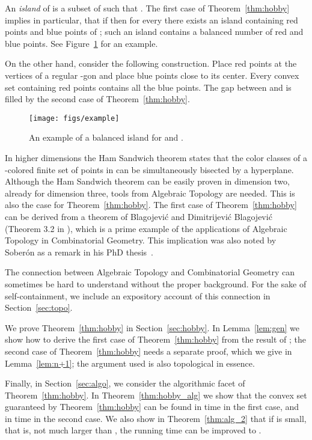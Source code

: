 \documentclass{article}
\begin{document}
An \emph{island} of  is a subset  of  such that .
The first case of Theorem~\ref{thm:hobby} implies in particular, that if  then
for every  there exists an island containing 
 red points and  blue points of ; such an island contains a balanced
number of red and blue points.  See Figure~\ref{fig:example} for an example.

On the other hand, consider the following construction.
Place  red points at the vertices of a regular -gon and place
 blue points close to its center. Every convex set containing 
 red points contains all the blue points.
The gap between  and 
is filled by the second case of Theorem~\ref{thm:hobby}.

\begin{figure}
  \begin{center}
   \texttt{[image: figs/example]}
\end{center}
\caption{An example of a balanced island for  and .}
\label{fig:example}
\end{figure}

In higher dimensions the Ham Sandwich theorem states that the color 
classes of a -colored finite set of points  in  can be 
simultaneously bisected by a hyperplane. Although the Ham Sandwich 
theorem can be easily proven in dimension two, already
for dimension three, tools from Algebraic Topology 
are needed. This is also the case for Theorem~\ref{thm:hobby}.
The first case of Theorem~\ref{thm:hobby} can be derived from
a theorem of Blagojevi\'c and Dimitrijevi\'c Blagojevi\'c (Theorem 3.2 in \cite{equivariant}), 
which is a prime example of the applications of Algebraic Topology in Combinatorial Geometry.
This implication was also noted by Sober\'on as a remark in his PhD thesis~\cite{pablo}. 

The connection between Algebraic Topology and Combinatorial Geometry
can sometimes be hard to understand without the proper background.
For the sake of self-containment, 
we include an expository account of this connection in Section~\ref{sec:topo}.

We prove Theorem~\ref{thm:hobby} in Section~\ref{sec:hobby}. In Lemma~\ref{lem:gen}
we show how to derive the first case of Theorem~\ref{thm:hobby} from the result
of \cite{equivariant};  the second case of Theorem~\ref{thm:hobby} needs a separate proof, 
which we give in Lemma~\ref{lem:n+1}; the argument used is also topological in essence. 


Finally,  in Section~\ref{sec:algo}, we consider the algorithmic facet of Theorem~\ref{thm:hobby}. In 
 Theorem~\ref{thm:hobby_alg} we show that the convex set guaranteed by Theorem~\ref{thm:hobby} can
be found in  time in the first case, and in   time
in the second case. We also show in Theorem~\ref{thm:alg_2} that if 
 is small, that is, not much larger than
, the running time  can be improved
to . 
\end{document}
